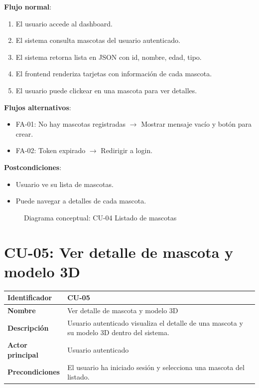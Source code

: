 \documentclass[12pt,a4paper]{article}
\begin{document}
\vspace{0.5em}

\textbf{Flujo normal}:
\begin{enumerate}[leftmargin=*]
    \item El usuario accede al dashboard.
    \item El sistema consulta mascotas del usuario autenticado.
    \item El sistema retorna lista en JSON con id, nombre, edad, tipo.
    \item El frontend renderiza tarjetas con informaci\'on de cada mascota.
    \item El usuario puede clickear en una mascota para ver detalles.
\end{enumerate}

\textbf{Flujos alternativos}:
\begin{itemize}[leftmargin=*]
    \item FA-01: No hay mascotas registradas $\rightarrow$ Mostrar mensaje vac\'io y bot\'on para crear.
    \item FA-02: Token expirado $\rightarrow$ Redirigir a login.
\end{itemize}

\textbf{Postcondiciones}:
\begin{itemize}[leftmargin=*]
    \item Usuario ve su lista de mascotas.
    \item Puede navegar a detalles de cada mascota.
\end{itemize}

\begin{figure}[h]
\centering
{}
\caption{Diagrama conceptual: CU-04 Listado de mascotas}
\end{figure}

\newpage

\section{CU-05: Ver detalle de mascota y modelo 3D}

\begin{tabular}{|p{3.5cm}|p{10cm}|}
\hline
\textbf{Identificador} & CU-05 \\
\hline
\textbf{Nombre} & Ver detalle de mascota y modelo 3D \\
\hline
\textbf{Descripci\'on} & Usuario autenticado visualiza el detalle de una mascota y su modelo 3D dentro del sistema. \\
\hline
\textbf{Actor principal} & Usuario autenticado \\
\hline
\textbf{Precondiciones} & El usuario ha iniciado sesi\'on y selecciona una mascota del listado. \\
\hline
\end{tabular}
\end{document}
